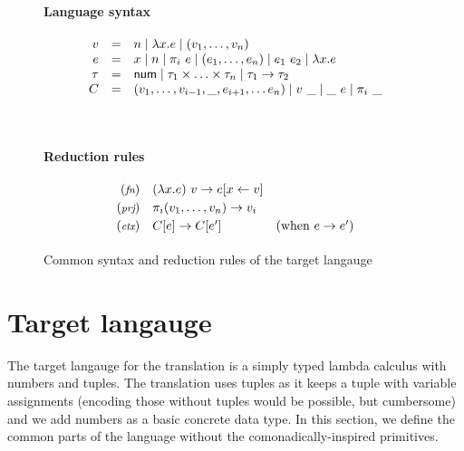 \documentclass[
		twoside,openright,titlepage,numbers=noenddot,headinclude,%
                footinclude=true,cleardoublepage=empty,
                BCOR=10mm,paper=a4,fontsize=10pt, %
                ngerman,american, %
                ]{scrreprt}
\newcommand{\sep}[0]{\; | \;}
\newcommand{\ident}[1]{\textnormal{\sffamily #1}}
\begin{document}

\begin{figure}[t]
\paragraph{Language syntax}  
\begin{equation*}
\begin{array}{rcl}
  v &  = & n \sep \lambda x.e \sep (v_1, \ldots, v_n) \\
  e &  = & x \sep n \sep \pi_i~e \sep (e_1, \ldots, e_n) \sep e_1~e_2 \sep \lambda x.e \\
  \tau &  = & \ident{num} \sep \tau_1 \times \ldots \times \tau_n \sep \tau_1 \rightarrow \tau_2 \\
  C  & = & (v_1, \ldots, v_{i-1}, \_, e_{i+1}, \ldots e_n) \sep v~\_ \sep \_~e \sep \pi_i~\_ 
  
\end{array}
\end{equation*}

~
\paragraph{Reduction rules}
\begin{equation*}
\begin{array}{rll}
  \footnotesize{(\emph{fn})}  & (\lambda x.e)~v \rightarrow e[x\leftarrow v] \\[0.25em]
  \footnotesize{(\emph{prj})} & \pi_i (v_1, \ldots, v_n) \rightarrow v_i\\[0.25em]
  \footnotesize{(\emph{ctx})}  & C[e] \rightarrow C[e']  & (\textnormal{when}~e\rightarrow e')\\[0.25em]
\end{array}
\end{equation*}

\caption{Common syntax and reduction rules of the target langauge}
\label{fig:transl-target}
\end{figure}


\section{Target langauge}

The target langauge for the translation is a simply typed lambda calculus with numbers and tuples.
The translation uses tuples as it keeps a tuple with variable assignments (encoding those without 
tuples would be possible, but cumbersome) and we add numbers as a basic concrete data type.
In this section, we define the common parts of the language without the comonadically-inspired
primitives.
\end{document}
